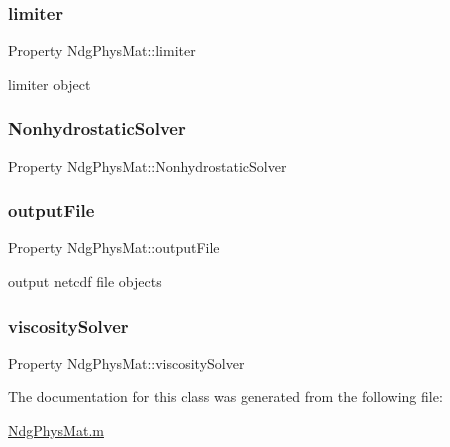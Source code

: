 \subsubsection{\texorpdfstring{limiter}{limiter}}
{\footnotesize\ttfamily Property Ndg\+Phys\+Mat\+::limiter\hspace{0.3cm}{\ttfamily [protected]}}



limiter object 

\mbox{\label{class_ndg_phys_mat_a7e127b3884311d8faef84b425f570d02}} 
\subsubsection{\texorpdfstring{Nonhydrostatic\+Solver}{NonhydrostaticSolver}}
{\footnotesize\ttfamily Property Ndg\+Phys\+Mat\+::\+Nonhydrostatic\+Solver\hspace{0.3cm}{\ttfamily [protected]}}

\mbox{\label{class_ndg_phys_mat_aac9e4a524cf327bce5a9cf043d63e9fa}} 
\subsubsection{\texorpdfstring{output\+File}{outputFile}}
{\footnotesize\ttfamily Property Ndg\+Phys\+Mat\+::output\+File\hspace{0.3cm}{\ttfamily [protected]}}



output netcdf file objects 

\mbox{\label{class_ndg_phys_mat_a5b92d892d770769a1bfe205d95149c59}} 
\subsubsection{\texorpdfstring{viscosity\+Solver}{viscositySolver}}
{\footnotesize\ttfamily Property Ndg\+Phys\+Mat\+::viscosity\+Solver\hspace{0.3cm}{\ttfamily [protected]}}



The documentation for this class was generated from the following file\+:\begin{DoxyCompactItemize}
\item 
\hyperlink{_ndg_phys_mat_8m}{Ndg\+Phys\+Mat.\+m}\end{DoxyCompactItemize}
